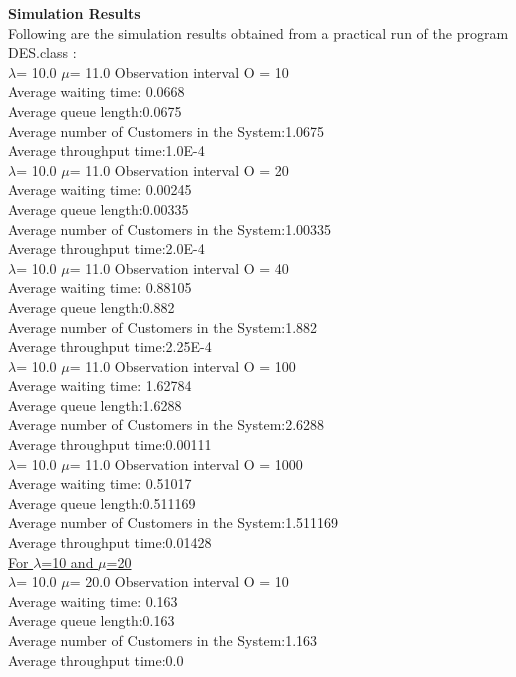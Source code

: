 \documentclass[a4paper,10pt]{report}
\begin{document}
\noindent \textbf{Simulation Results}\\
Following are the simulation results obtained from a practical run of the program DES.class :\\
$\lambda$= 10.0 $\mu$= 11.0 Observation interval O = 10\\
Average waiting time: 0.0668\\
Average queue length:0.0675\\
Average number of Customers in the System:1.0675\\
Average throughput time:1.0E-4\\

\noindent$\lambda$= 10.0 $\mu$= 11.0 Observation interval O = 20\\
Average waiting time: 0.00245\\
Average queue length:0.00335\\
Average number of Customers in the System:1.00335\\
Average throughput time:2.0E-4\\

\noindent$\lambda$= 10.0 $\mu$= 11.0 Observation interval O = 40\\
Average waiting time: 0.88105\\
Average queue length:0.882\\
Average number of Customers in the System:1.882\\
Average throughput time:2.25E-4\\

\noindent$\lambda$= 10.0 $\mu$= 11.0 Observation interval O = 100\\
Average waiting time: 1.62784\\
Average queue length:1.6288\\
Average number of Customers in the System:2.6288\\
Average throughput time:0.00111\\

\noindent$\lambda$= 10.0 $\mu$= 11.0 Observation interval O = 1000\\
Average waiting time: 0.51017\\
Average queue length:0.511169\\
Average number of Customers in the System:1.511169\\
Average throughput time:0.01428\\

\noindent \underline{For $\lambda$=10 and $\mu$=20}\\
$\lambda$= 10.0 $\mu$= 20.0 Observation interval O = 10\\
Average waiting time: 0.163\\
Average queue length:0.163\\
Average number of Customers in the System:1.163\\
Average throughput time:0.0\\
\end{document}
